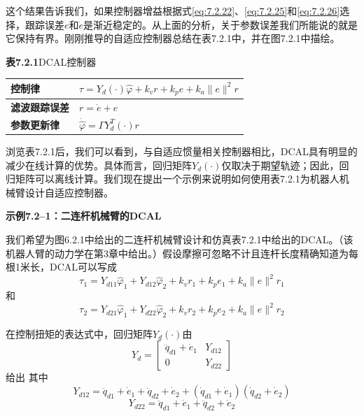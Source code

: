 \documentclass[UTF8]{ctexart}
\begin{document}
这个结果告诉我们，如果控制器增益根据式\eqref{eq:7.2.22}、\eqref{eq:7.2.25}和\eqref{eq:7.2.26}选择，跟踪误差$e$和$\dot{e}$是渐近稳定的。从上面的分析，关于参数误差我们所能说的就是它保持有界。刚刚推导的自适应控制器总结在表7.2.1中，并在图7.2.1中描绘。

\textbf{表7.2.1}\quad DCAL控制器

\begin{center}
\begin{tabular}{|l|l|}
\hline
\textbf{控制律} & $\tau = Y_d(\cdot)\hat{\varphi} + k_v r + k_p e + k_a \|e\|^2 r$ \\
\hline
\textbf{滤波跟踪误差} & $r = \dot{e} + e$ \\
\hline
\textbf{参数更新律} & $\dot{\hat{\varphi}} = \Gamma Y_d^T(\cdot) r$ \\
\hline
\end{tabular}
\end{center}

浏览表7.2.1后，我们可以看到，与自适应惯量相关控制器相比，DCAL具有明显的减少在线计算的优势。具体而言，回归矩阵$Y_d(\cdot)$仅取决于期望轨迹；因此，回归矩阵可以离线计算。我们现在提出一个示例来说明如何使用表7.2.1为机器人机械臂设计自适应控制器。

\textbf{示例7.2--1：二连杆机械臂的DCAL}

我们希望为图6.2.1中给出的二连杆机械臂设计和仿真表7.2.1中给出的DCAL。（该机器人臂的动力学在第3章中给出。）假设摩擦可忽略不计且连杆长度精确知道为每根1米长，DCAL可以写成
\begin{equation}
\tau_1 = Y_{d11}\hat{\varphi}_1 + Y_{d12}\hat{\varphi}_2 + k_v r_1 + k_p e_1 + k_a \|e\|^2 r_1
\end{equation}
和
\begin{equation}
\tau_2 = Y_{d21}\hat{\varphi}_1 + Y_{d22}\hat{\varphi}_2 + k_v r_2 + k_p e_2 + k_a \|e\|^2 r_2
\end{equation}

在控制扭矩的表达式中，回归矩阵$Y_d(\cdot)$由
\begin{equation}
Y_d = \begin{bmatrix}
\ddot{q}_{d1} + \dot{e}_1 & Y_{d12} \\
0 & Y_{d22}
\end{bmatrix}
\end{equation}
给出
其中
\begin{equation*}
Y_{d12} = \ddot{q}_{d1} + \dot{e}_1 + \ddot{q}_{d2} + \dot{e}_2 + (\dot{q}_{d1} + \dot{e}_1)(\dot{q}_{d2} + \dot{e}_2)
\end{equation*}
\begin{equation*}
Y_{d22} = \ddot{q}_{d1} + \dot{e}_1 + \ddot{q}_{d2} + \dot{e}_2
\end{equation*}
\end{document}
